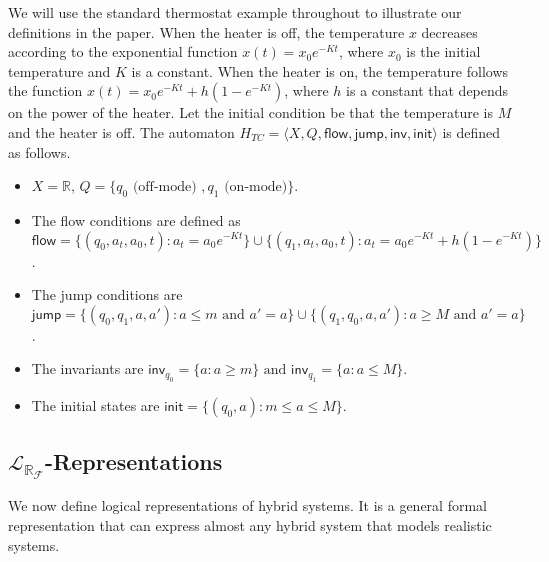 \documentclass[envcountsect]{llncs}
\newcommand{\flow}{\mathsf{flow}}
\newcommand{\jump}{\mathsf{jump}}
\newcommand{\inv}{\mathsf{inv}}
\newcommand{\init}{\mathsf{init}}
\newcommand{\lrf}{\mathcal{L}_{\mathbb{R}_{\mathcal{F}}}}
\begin{document}
\begin{example}\label{hybridtcontrol} 
We will use the standard thermostat example throughout to illustrate our
definitions in the paper. When the heater is off, the temperature $x$ decreases
according to the exponential function $x(t) = x_0 e^{-Kt}$, where $x_0$ is the
initial temperature and $K$ is a constant. When the heater is on, the
temperature follows the function $x(t) = x_0 e^{-Kt} + h(1-e^{-Kt})$, where $h$
is a constant that depends on the power of the heater. Let the initial condition
be that the temperature is $M$ and the heater is off. The automaton $H_{TC} =
\langle X, Q, \flow, \jump, \inv, \init\rangle$ is defined as follows. 
\begin{itemize}
\item $X = \mathbb{R}$, $Q = \{q_0\mbox{ (off-mode) }, q_1\mbox{ (on-mode)}\}$.
\item The flow conditions are defined as $\flow= \{(q_0, a_t, a_0, t): a_t =
a_0e^{-Kt}\}\cup \{ (q_1, a_t, a_0, t): a_t =
a_0e^{-Kt}+h(1-e^{-Kt})\}$.
\item The jump conditions are $\jump=\{(q_0, q_1, a, a'): a\leq
m\mbox{ and }a' = a\}\cup \{(q_1, q_0, a,a'): a\geq M
\mbox{ and }a'=a\}$.
\item The invariants are $\inv_{q_0} = \{a: a\geq m\} \mbox{ and }
\inv_{q_1} = \{a: a\leq M\}.$
\item The initial states are $\init = \{(q_0, a): m\leq a\leq M\}.$
\end{itemize}
\end{example}


\subsection{$\lrf$-Representations}

We now define logical representations of hybrid systems. It is a general
formal representation that can express almost any hybrid system that models
realistic systems. 
\end{document}
